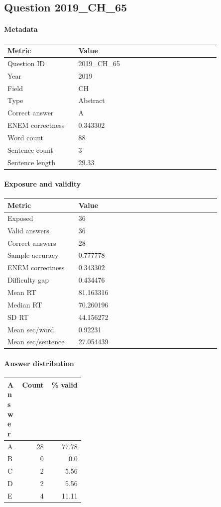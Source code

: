 \subsection*{Question 2019\_CH\_65}
\label{sec:q_2019_CH_65}
\paragraph{Metadata}
\begin{tabular}{p{0.30\linewidth}p{0.60\linewidth}}
\toprule
Metric & Value\\
\midrule
Question ID & 2019\_CH\_65\\
Year & 2019\\
Field & CH\\
Type & Abstract\\
Correct answer & A\\
ENEM correctness & 0.343302\\
Word count & 88\\
Sentence count & 3\\
Sentence length & 29.33\\
\bottomrule
\end{tabular}

\paragraph{Exposure and validity}
\begin{tabular}{p{0.30\linewidth}p{0.60\linewidth}}
\toprule
Metric & Value\\
\midrule
Exposed & 36\\
Valid answers & 36\\
Correct answers & 28\\
Sample accuracy & 0.777778\\
ENEM correctness & 0.343302\\
Difficulty gap & 0.434476\\
Mean RT & 81.163316\\
Median RT & 70.260196\\
SD RT & 44.156272\\
Mean sec/word & 0.92231\\
Mean sec/sentence & 27.054439\\
\bottomrule
\end{tabular}

\paragraph{Answer distribution}
\begin{tabular}{p{0.18\linewidth}rr}
\toprule
Answer & Count & \% valid\\
\midrule
A & 28 & 77.78\\
B & 0 & 0.0\\
C & 2 & 5.56\\
D & 2 & 5.56\\
E & 4 & 11.11\\
\bottomrule
\end{tabular}

